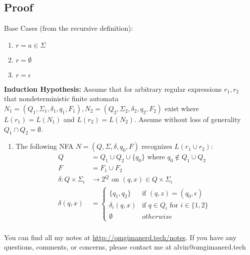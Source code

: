 \documentclass{math}
\begin{document}
\subsection*{Proof}
Base Cases (from the recursive definition):
\begin{enumerate}[{Case} 1:]
  \item \( r = a\in\Sigma \)
  \item \( r = \emptyset \)
  \item \( r = \epsilon \)
\end{enumerate}
\textbf{Induction Hypothesis:} Assume that for arbitrary regular expressions
\( r_1,r_2 \) that nondeterministic finite automata \( N_1 =
(Q_1,\Sigma_1,\delta_1,q_1,F_1), N_2 = (Q_2,\Sigma_2,\delta_2,q_2,F_2) \) exist
where \( L(r_1) = L(N_1) \) and \( L(r_2) = L(N_2) \). Assume without loss of
generality \( Q_1\cap Q_2 = \emptyset \).
\begin{enumerate}[{Case} 1:]
  \item The following NFA \( N = (Q,\Sigma,\delta,q_0,F) \) recognizes
  \( L(r_1\cup r_2) \):
  \begin{align*}
    Q &= Q_1\cup Q_2\cup \{q_0\} \text{ where } q_0\notin Q_1\cup Q_2 \\
    F &= F_1\cup F_2 \\
    \delta:Q\times\Sigma_{\epsilon} &\to 2^Q\text{ on }(q,x)\in
      Q\times\Sigma_{\epsilon} \\
    \delta(q,x) &= \begin{cases}
      \{q_1,q_2\} & \text{if } (q,z) = (q_0,\epsilon) \\
      \delta_i(q,x) & \text{if } q\in Q_i\text{ for }i\in\{1,2\} \\
      \emptyset & otherwise
    \end{cases} \\
  \end{align*}
\end{enumerate}

\begin{center}
  You can find all my notes at \url{http://omgimanerd.tech/notes}. If you have
  any questions, comments, or concerns, please contact me at
  alvin@omgimanerd.tech
\end{center}
\end{document}
